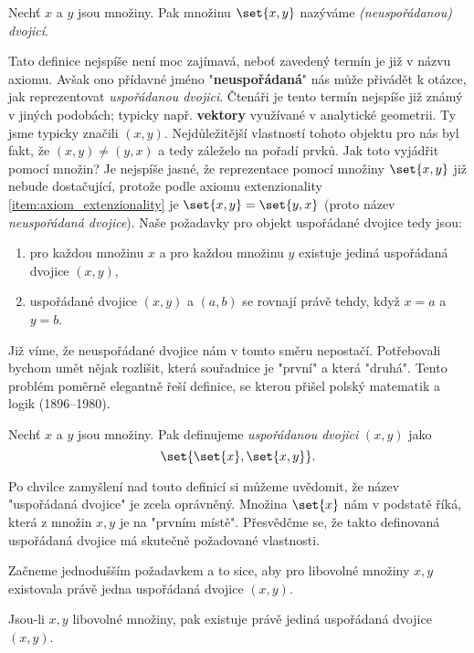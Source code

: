 \begin{definition}
    Nechť $x$ a $y$ jsou množiny. Pak množinu $\set{x,y}$ nazýváme \emph{(neuspořádanou) dvojicí}.
\end{definition}
Tato definice nejspíše není moc zajímavá, neboť zavedený termín je již v názvu axiomu. Avšak ono přídavné jméno "\textbf{neuspořádaná}" nás může přivádět k otázce, jak reprezentovat \emph{uspořádanou dvojici}. Čtenáři je tento termín nejspíše již známý v jiných podobách; typicky např. \textbf{vektory} využívané v analytické geometrii. Ty jsme typicky značili $(x,y)$. Nejdůležitější vlastností tohoto objektu pro nás byl fakt, že $(x,y)\neq (y,x)$ a tedy záleželo na pořadí prvků. Jak toto vyjádřit pomocí množin? Je nejspíše jasné, že reprezentace pomocí množiny $\set{x,y}$ již nebude dostačující, protože podle axiomu extenzionality \ref{item:axiom_extenzionality} je $\set{x,y}=\set{y,x}$ (proto název \emph{neuspořádaná dvojice}). Naše požadavky pro objekt uspořádané dvojice tedy jsou:
\begin{enumerate}
    \item pro každou množinu $x$ a pro každou množinu $y$ existuje jediná uspořádaná dvojice $(x,y)$,
    \item uspořádané dvojice $(x,y)$ a $(a,b)$ se rovnají právě tehdy, když $x=a$ a $y=b$.
\end{enumerate}
Již víme, že neuspořádané dvojice nám v tomto směru nepostačí. Potřebovali bychom umět nějak rozlišit, která souřadnice je "první" a která "druhá". Tento problém poměrně elegantně řeší definice, se kterou přišel polský matematik a logik  (1896--1980).
\begin{definition}\label{def:usporadana_dvojice}
    Nechť $x$ a $y$ jsou množiny. Pak definujeme \emph{uspořádanou dvojici} $(x,y)$ jako
    \begin{equation*}
        \set{\set{x},\set{x,y}}.
    \end{equation*}
\end{definition}
Po chvilce zamyšlení nad touto definicí si můžeme uvědomit, že název "uspořádaná dvojice" je zcela oprávněný. Množina $\set{x}$ nám v podstatě  říká, která z množin $x,y$ je na "prvním místě". Přesvědčme se, že takto definovaná uspořádaná dvojice má skutečně požadované vlastnosti.\par
Začneme jednodušším požadavkem a to sice, aby pro libovolné množiny $x,y$ existovala právě jedna uspořádaná dvojice $(x,y)$.
\begin{lemma}
    Jsou-li $x,y$ libovolné množiny, pak existuje právě jediná uspořádaná dvojice $(x,y)$.
\end{lemma}
